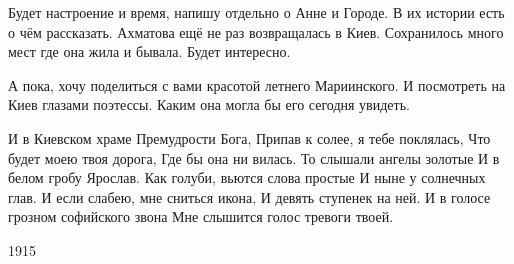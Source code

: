 Будет настроение и время, напишу отдельно о Анне и Городе. В их истории есть о
чём рассказать. Ахматова ещё не раз возвращалась в Киев. Сохранилось много мест
где она жила и бывала. Будет интересно.

А пока, хочу поделиться с вами красотой летнего Мариинского. И посмотреть на
Киев глазами поэтессы. Каким она могла бы его сегодня увидеть.

\obeycr
И в Киевском храме Премудрости Бога,
Припав к солее, я тебе поклялась,
Что будет моею твоя дорога,
Где бы она ни вилась.
То слышали ангелы золотые
И в белом гробу Ярослав.
Как голуби, вьются слова простые
И ныне у солнечных глав.
И если слабею, мне сниться икона,
И девять ступенек на ней.
И в голосе грозном софийского звона
Мне слышится голос тревоги твоей.
\restorecr

1915
